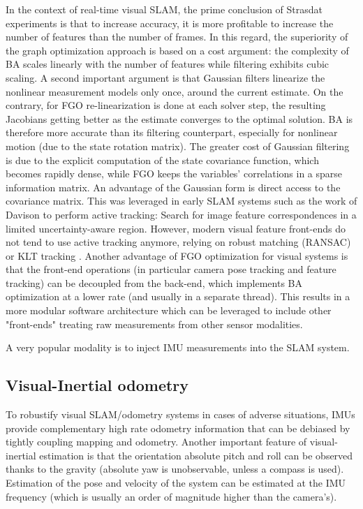 In the context of real-time visual SLAM, the prime conclusion of Strasdat experiments \cite{strasdat2012visual} is that to increase accuracy, it is more
profitable to increase the number of features than the number of frames. In this regard, the superiority of the graph optimization approach is 
based on a cost argument: the complexity of BA scales linearly with the number of features while filtering exhibits cubic scaling. A second important argument 
is that Gaussian filters linearize the nonlinear measurement models only once, around the current estimate. On the contrary, 
for FGO re-linearization is done at each solver step, the resulting Jacobians getting better as the estimate converges
to the optimal solution. BA is therefore more accurate than its filtering counterpart, especially for nonlinear motion (due to the state rotation matrix).
The greater cost of Gaussian filtering is due to the explicit computation of the state covariance function, which becomes rapidly dense,
while FGO keeps the variables' correlations in a sparse information matrix. An advantage of the Gaussian form is direct access to the 
covariance matrix. This was leveraged in early SLAM systems such as the work of Davison \cite{davison2007monoslam} to perform active tracking: 
Search for image feature correspondences in a limited uncertainty-aware region. However, modern visual feature front-ends do not tend to
use active tracking anymore, relying on robust matching (RANSAC) \cite{mur2015orb} or KLT tracking \cite{baker2004lucas, ferrera2021ov}. Another advantage of 
FGO optimization for visual systems is that the front-end operations (in particular camera pose tracking and feature tracking) can be decoupled
from the back-end, which implements BA optimization at a lower rate (and usually in a separate thread). This results in a more modular software 
architecture which can be leveraged to include other "front-ends" treating raw measurements from other sensor modalities. 

A very popular modality is to inject IMU measurements into the SLAM system.


\subsection{Visual-Inertial odometry}
To robustify visual SLAM/odometry systems in cases of adverse situations, IMUs provide complementary high rate odometry information that can 
be debiased by tightly coupling mapping and odometry. Another important feature of visual-inertial estimation is that the orientation absolute 
pitch and roll can be observed thanks to the gravity (absolute yaw is unobservable, unless a compass is used). Estimation of the pose and velocity
of the system can be estimated at the IMU frequency (which is usually an order of magnitude higher than the camera's).

